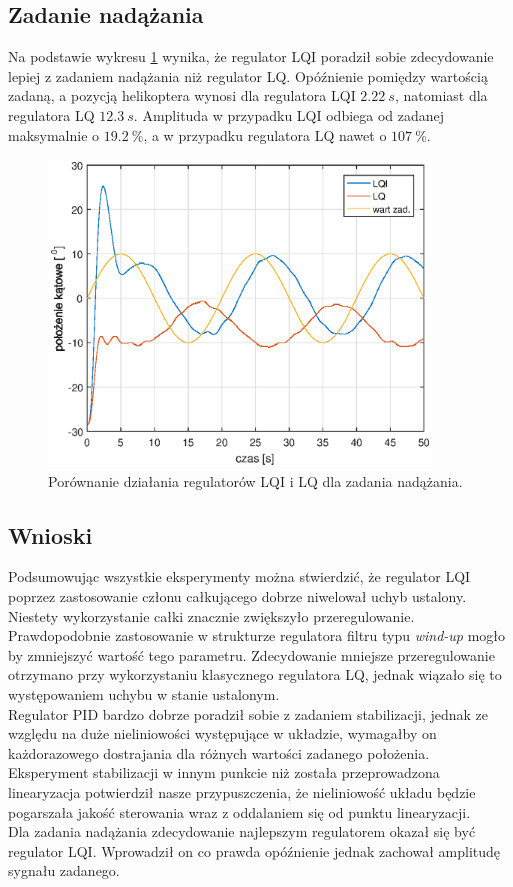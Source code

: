 \documentclass[11pt,a4paper]{article}
\begin{document}
\subsection{Zadanie nadążania}
Na podstawie wykresu \ref{fig:por_foll_LQILQ} wynika, że regulator LQI poradził sobie zdecydowanie lepiej z zadaniem nadążania niż regulator LQ. Opóźnienie pomiędzy wartością zadaną, a pozycją helikoptera wynosi dla regulatora LQI $2.22 \ s$, natomiast dla regulatora LQ $12.3 \ s$. Amplituda w przypadku LQI odbiega od zadanej maksymalnie o $19.2 \ \%$, a w przypadku regulatora LQ nawet o $107 \ \%$. 
\begin{figure}[H]
	\centering
	\includegraphics[width=4in]{Figures/por_foll_LQLQI.eps}
	\caption{Porównanie działania regulatorów LQI i LQ dla zadania nadążania.}
	\label{fig:por_foll_LQILQ}
\end{figure}

\subsection{Wnioski}
Podsumowując wszystkie eksperymenty można stwierdzić, że regulator LQI poprzez zastosowanie członu całkującego dobrze niwelował uchyb ustalony. Niestety wykorzystanie całki znacznie zwiększyło przeregulowanie. Prawdopodobnie zastosowanie w strukturze regulatora filtru typu \textit{wind-up} mogło by zmniejszyć wartość tego parametru. Zdecydowanie mniejsze przeregulowanie otrzymano przy wykorzystaniu klasycznego regulatora LQ, jednak wiązało się to występowaniem uchybu w stanie ustalonym. \\
Regulator PID bardzo dobrze poradził sobie z zadaniem stabilizacji, jednak ze względu na duże nieliniowości występujące w układzie, wymagałby on każdorazowego dostrajania dla różnych wartości zadanego położenia. \\
Eksperyment stabilizacji w innym punkcie niż została przeprowadzona linearyzacja potwierdził nasze przypuszczenia, że nieliniowość układu będzie pogarszała jakość sterowania wraz z oddalaniem się od punktu linearyzacji.\\
Dla zadania nadążania zdecydowanie najlepszym regulatorem okazał się być regulator LQI. Wprowadził on co prawda opóźnienie jednak zachował amplitudę sygnału zadanego.
\end{document}
